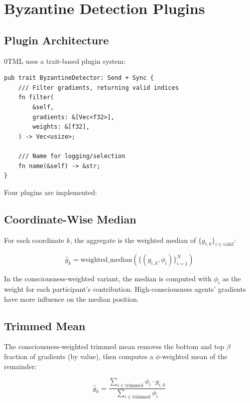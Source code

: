 \documentclass[11pt,twocolumn]{article}
\begin{document}
\section{Byzantine Detection Plugins}

\subsection{Plugin Architecture}

0TML uses a trait-based plugin system:

\begin{lstlisting}
pub trait ByzantineDetector: Send + Sync {
    /// Filter gradients, returning valid indices
    fn filter(
        &self,
        gradients: &[Vec<f32>],
        weights: &[f32],
    ) -> Vec<usize>;

    /// Name for logging/selection
    fn name(&self) -> &str;
}
\end{lstlisting}

Four plugins are implemented:

\subsection{Coordinate-Wise Median}

For each coordinate $k$, the aggregate is the weighted median of
$\{g_{i,k}\}_{i \in \text{valid}}$:

\begin{equation}
  \hat{g}_k = \text{weighted\_median}(\{(g_{i,k}, \phi_i)\}_{i=1}^N)
\end{equation}

In the consciousness-weighted variant, the median is computed with
$\phi_i$ as the weight for each participant's contribution. High-consciousness
agents' gradients have more influence on the median position.

\subsection{Trimmed Mean}

The consciousness-weighted trimmed mean removes the bottom and top
$\beta$ fraction of gradients (by value), then computes a
$\phi$-weighted mean of the remainder:

\begin{equation}
  \hat{g}_k = \frac{\sum_{i \in \text{trimmed}} \phi_i \cdot g_{i,k}}
    {\sum_{i \in \text{trimmed}} \phi_i}
\end{equation}
\end{document}
